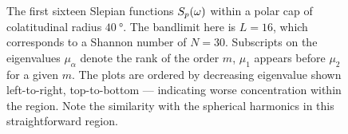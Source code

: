 \begin{figure}[htpb]
	\hfill
	\caption[
		The Slepian functions within a \(\SI{40}{\degree}\) polar cap
	]{
		The first sixteen Slepian functions \({S}_{p}(\omega)\) within a polar cap of colatitudinal radius \(\SI{40}{\degree}\).
		The bandlimit here is  \(L=16\), which corresponds to a Shannon number of \(N=30\).
		Subscripts on the eigenvalues \(\mu_{\alpha}\) denote the rank of the order \(m\), \ie{} \(\mu_{1}\) appears before \(\mu_{2}\) for a given \(m\).
		The plots are ordered by decreasing eigenvalue shown left-to-right, top-to-bottom --- indicating worse concentration within the region.
		Note the similarity with the spherical harmonics in this straightforward region.
	}\label{fig:chapter2_slepian_polar_cap}
\end{figure}
